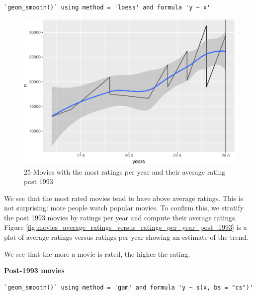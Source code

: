 \documentclass[
]{article}
\begin{document}
\begin{verbatim}
`geom_smooth()` using method = 'loess' and formula 'y ~ x'
\end{verbatim}

\begin{figure}
\centering
\includegraphics{figures/md_3-1.pdf}
\caption{25 Movies with the most ratings per year and their average
rating post
1993\label{fig:25_movies_avg_and_most_ratings_per_year_post_1993}}
\end{figure}

\newpage

We see that the most rated movies tend to have above average ratings.
This is not surprising: more people watch popular movies. To confirm
this, we stratify the post 1993 movies by ratings per year and compute
their average ratings. Figure
\ref{fig:movies_average_ratings_versus_ratings_per_year_post_1993} is a
plot of average ratings versus ratings per year showing an estimate of
the trend.

We see that the more a movie is rated, the higher the rating.

\textbf{Post-1993 movies}

\begin{verbatim}
`geom_smooth()` using method = 'gam' and formula 'y ~ s(x, bs = "cs")'
\end{verbatim}
\end{document}

